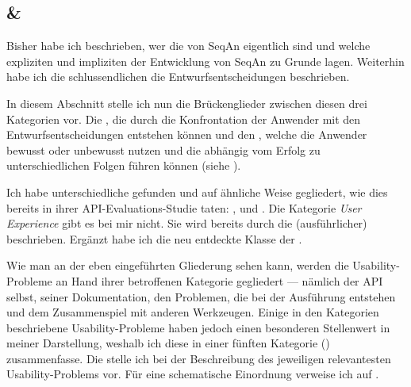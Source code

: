 \subsection[Usability-Probleme \& Strategien]{ \& }

Bisher habe ich beschrieben, wer die  von SeqAn eigentlich sind und welche expliziten und impliziten  der Entwicklung von SeqAn zu Grunde lagen. Weiterhin habe ich die schlussendlichen  die Entwurfsentscheidungen beschrieben.

In diesem Abschnitt stelle ich nun die Brückenglieder zwischen diesen drei Kategorien vor. Die , die durch die Konfrontation der Anwender mit den Entwurfsentscheidungen entstehen können und den , welche die Anwender bewusst oder unbewusst nutzen und die abhängig vom Erfolg zu unterschiedlichen Folgen führen können (siehe ).

Ich habe unterschiedliche  gefunden und auf ähnliche Weise gegliedert, wie dies \cite{Grill:2012jm} bereits in ihrer API-Evaluations-Studie taten: ,  und . Die Kategorie \textit{User Experience} gibt es bei mir nicht. Sie wird bereits durch die  (ausführlicher) beschrieben. Ergänzt habe ich die neu entdeckte Klasse der .

Wie man an der eben eingeführten Gliederung sehen kann, werden die Usability-Probleme an Hand ihrer betroffenen Kategorie gegliedert --- nämlich der API selbst, seiner Dokumentation, den Problemen, die bei der Ausführung entstehen und dem Zusammenspiel mit anderen Werkzeugen. Einige in den Kategorien beschriebene Usability-Probleme haben jedoch einen besonderen Stellenwert in meiner Darstellung, weshalb ich diese in einer fünften Kategorie () zusammenfasse. Die  stelle ich bei der Beschreibung des jeweiligen relevantesten Usability-Problems vor. Für eine schematische Einordnung verweise ich auf . 

